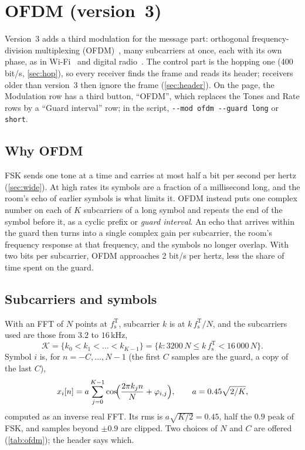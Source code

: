 \documentclass[11pt,a4paper]{article}
\newcommand{\kHz}{\,\mathrm{kHz}}
\newcommand{\code}[1]{\texttt{#1}}
\newcommand{\fsT}{f_{\mathrm{s}}^{\mathrm{T}}}
\theoremstyle{remark}
\begin{document}
\section{OFDM (version~3)}
\label{sec:ofdm}
Version~3 adds a third modulation for the message part: orthogonal frequency-division multiplexing (OFDM)~\cite{weinstein}, many subcarriers at once, each with its own phase, as in Wi-Fi~\cite{ieee80211} and digital radio~\cite{dab}. The control part is the hopping one (400 bit/s, \cref{sec:hop}), so every receiver finds the frame and reads its header; receivers older than version~3 then ignore the frame (\cref{sec:header}). On the page, the Modulation row has a third button, ``OFDM'', which replaces the Tones and Rate rows by a ``Guard interval'' row; in the script, \code{-{}-mod ofdm -{}-guard long} or \code{short}.

\subsection{Why OFDM}
FSK sends one tone at a time and carries at most half a bit per second per hertz (\cref{sec:wide}). At high rates its symbols are a fraction of a millisecond long, and the room's echo of earlier symbols is what limits it. OFDM instead puts one complex number on each of $K$ subcarriers of a long symbol and repeats the end of the symbol before it, as a cyclic prefix or \emph{guard interval}. An echo that arrives within the guard then turns into a single complex gain per subcarrier, the room's frequency response at that frequency, and the symbols no longer overlap. With two bits per subcarrier, OFDM approaches 2 bit/s per hertz, less the share of time spent on the guard.

\subsection{Subcarriers and symbols}
With an FFT of $N$ points at $\fsT$, subcarrier $k$ is at $k\,\fsT/N$, and the subcarriers used are those from 3.2 to $16\kHz$,
\begin{equation}
\mathcal K = \{k_0 < k_1 < \dots < k_{K-1}\} = \bigl\{k : 3200\,N \le k\,\fsT < 16\,000\,N\bigr\}.
\end{equation}
Symbol $i$ is, for $n = -C, \dots, N - 1$ (the first $C$ samples are the guard, a copy of the last $C$),
\begin{equation}
x_i[n] = a \sum_{j=0}^{K-1} \cos\!\Bigl(\frac{2\pi k_j n}{N} + \varphi_{i,j}\Bigr), \qquad a = 0.45\sqrt{2/K},
\label{eq:ofdmsym}
\end{equation}
computed as an inverse real FFT. Its rms is $a\sqrt{K/2} = 0.45$, half the $0.9$ peak of FSK, and samples beyond $\pm 0.9$ are clipped. Two choices of $N$ and $C$ are offered (\cref{tab:ofdm}); the header says which.
\end{document}

